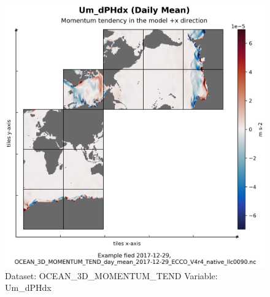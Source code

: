 \begin{figure}[H]
\centering
\includegraphics[width=\textwidth]{../images/plots/native_plots/Ocean_Three-Dimensional_Momentum_Tendency/Um_dPHdx.png}
\caption{Dataset: OCEAN\_3D\_MOMENTUM\_TEND Variable: Um\_dPHdx}
\label{tab:table-OCEAN_3D_MOMENTUM_TEND_Um_dPHdx-Plot}
\end{figure}
\pagebreak
